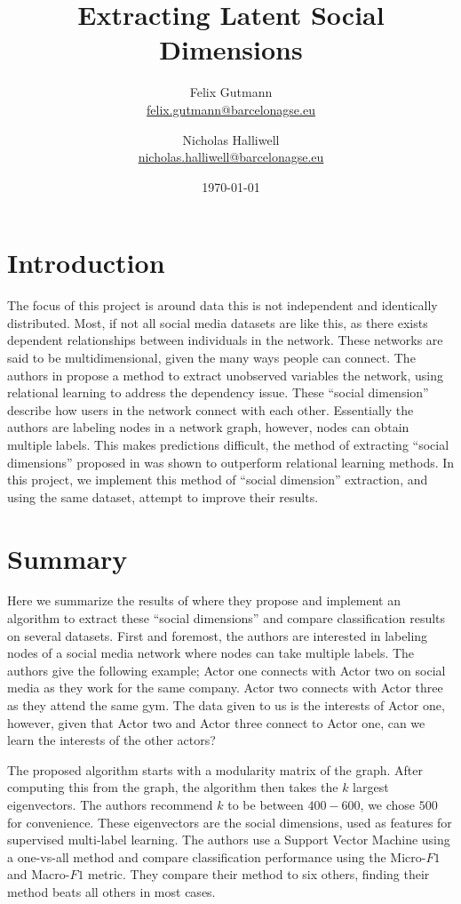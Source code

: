 \documentclass[11pt,letterpaper]{article}
\author{
	Felix Gutmann\\
	\href{mailto:felix.gutmann@barcelonagse.eu}{felix.gutmann@barcelonagse.eu}
	\and
	Nicholas Halliwell\\
	\href{mailto:nicholas.halliwell@barcelonagse.eu}{nicholas.halliwell@barcelonagse.eu}}
\title{Extracting Latent Social Dimensions}
\date{\today}
\begin{document}
\maketitle

\section*{Introduction} 
The focus of this project is around data this is not independent and identically distributed. Most, if not all social media datasets are like this, as there exists dependent relationships between individuals in the network. These networks are said to be multidimensional, given the many ways people can connect. The authors in \cite{latent} propose a method to extract unobserved variables the network, using relational learning to address the dependency issue. These ``social dimension'' describe how users in the network connect with each other. Essentially the authors are labeling nodes in a network graph, however, nodes can obtain multiple labels. This makes predictions difficult, the method of extracting ``social dimensions'' proposed in \cite{latent} was shown to outperform relational learning methods. In this project, we implement this method of ``social dimension'' extraction, and using the same dataset, attempt to improve their results.



\section*{Summary}
Here we summarize the results of \cite{latent} where they propose and implement an algorithm to extract these ``social dimensions'' and compare classification results on several datasets. First and foremost, the authors are interested in labeling nodes of a social media network where nodes can take multiple labels. The authors give the following example; Actor one connects with Actor two on social media as they work for the same company. Actor two connects with Actor three as they attend the same gym. The data given to us is the interests of Actor one, however, given that Actor two and Actor three connect to Actor one, can we learn the interests of the other actors?\par

The proposed algorithm starts with a modularity matrix of the graph. After computing this from the graph, the algorithm then takes the $k$ largest eigenvectors. The authors recommend $k$ to be between $400-600$, we chose $500$ for convenience. These eigenvectors are the social dimensions, used as features for supervised multi-label learning. The authors use a Support Vector Machine using a one-vs-all method and compare classification performance using the Micro-$F1$ and Macro-$F1$ metric. They compare their method to six others, finding their method beats all others in most cases. \par
\end{document}

